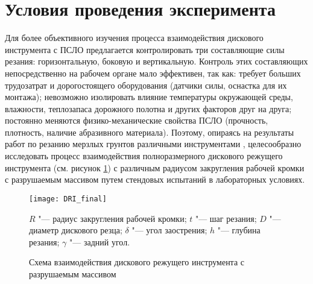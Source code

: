 \section{Условия проведения эксперимента}

Для более объективного изучения процесса взаимодействия дискового инструмента с ПСЛО предлагается контролировать три составляющие силы резания: горизонтальную, боковую и вертикальную. Контроль этих составляющих непосредственно на рабочем органе мало эффективен, так как: требует больших трудозатрат и дорогостоящего оборудования (датчики силы, оснастка для их монтажа); невозможно изолировать влияние температуры окружающей среды, влажности, теплозапаса дорожного полотна и других факторов друг на друга; постоянно меняются физико-механические свойства ПСЛО (прочность, плотность, наличие абразивного материала). Поэтому, опираясь на результаты работ по резанию мерзлых грунтов различными инструментами \cite{JelukevichGrunt, BaronTang, BaronShar, Zelenin}, целесообразно исследовать процесс взаимодействия полноразмерного дискового режущего инструмента (см. рисунок \ref{fig:DRI}) с различным радиусом закругления рабочей кромки с разрушаемым массивом путем стендовых испытаний в лабораторных условиях.
\begin{figure}[ht]
	\centering
	\texttt{[image: DRI\_final]}

	$R$ "--- радиус закругления рабочей кромки; $t$ "--- шаг резания; $D$ "--- диаметр дискового резца; $\delta$ "--- угол заострения; $h$ "--- глубина резания; $\gamma$ "--- задний угол. 
	\caption{Схема взаимодействия дискового режущего инструмента с разрушаемым массивом} 
	\label{fig:DRI}  
\end{figure}

